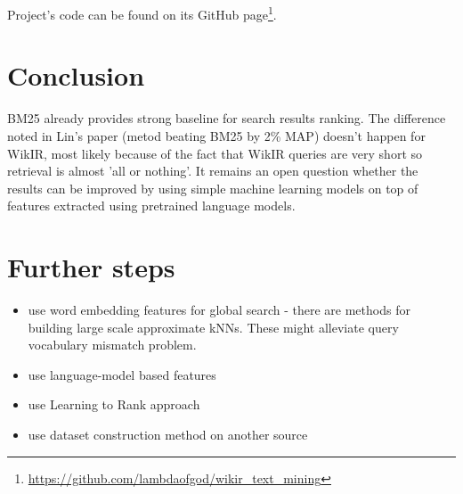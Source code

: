 \documentclass{article}
\begin{document}
Project's code can be found on its GitHub page\footnote{\href{https://github.com/lambdaofgod/wikir_text_mining}{https://github.com/lambdaofgod/wikir_text_mining}}.

\section{Conclusion}
BM25 already provides strong baseline for search results ranking. The difference noted in Lin's paper (metod beating BM25 by 2\% MAP) doesn't happen for WikIR, most likely because of the fact that WikIR queries are very short so retrieval is almost 'all or nothing'. It remains an open question whether the results can be improved by using simple machine learning models on top of features extracted using pretrained language models.

\section{Further steps}
\begin{itemize}
    \item use word embedding features for global search - there are methods for building large scale approximate kNNs. These might alleviate query vocabulary mismatch problem.
    \item use language-model based features
    \item use Learning to Rank approach
    \item use dataset construction method on another source
\end{itemize}



\end{document}
